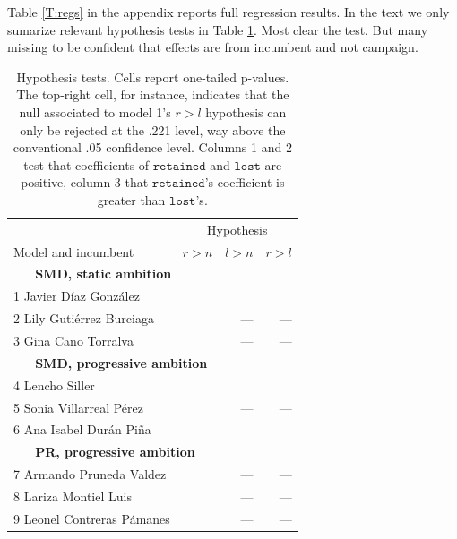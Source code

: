 \documentclass[letter,12pt]{article}
\begin{document}
Table \ref{T:regs} in the appendix reports full regression results. In the text we only sumarize relevant hypothesis tests in Table \ref{T:hyp-tests}. Most clear the test. But many missing to be confident that effects are from incumbent and not campaign.

\begin{table}
\centering
  \begin{tabular}{lrrr}
                          & \multicolumn{3}{c}{Hypothesis} \\
  Model and incumbent     & $r>n$ & $l>n$ & $r>l$ \\ \hline
  \multicolumn{4}{l}{\textbf{~~~SMD, static ambition}} \\
1 Javier Díaz González    & \color{green}{$<.001$} & \color{green}{$.029$} & \color{red}{$.221$} \\
2 Lily Gutiérrez Burciaga & \color{green}{$<.001$} & ---    & --- \\
3 Gina Cano Torralva      & \color{green}{$<.001$} & ---    & --- \\
  \multicolumn{4}{l}{\textbf{~~~SMD, progressive ambition}} \\
4 Lencho Siller           & \color{green}{$<.001$} & \color{green}{$.003$} & \color{green}{$.001$} \\
5 Sonia Villarreal Pérez  & \color{green}{$<.001$} & ---    & --- \\
6 Ana Isabel Durán Piña   & \color{green}{$<.001$} & \color{green}{$.036$} & \color{green}{$<.001$} \\
  \multicolumn{4}{l}{\textbf{~~~PR, progressive ambition}} \\
7 Armando Pruneda Valdez  & \color{green}{$.030$}  & ---    & --- \\
8 Lariza Montiel Luis     & \color{red}{$.385$}    & ---    & --- \\
9 Leonel Contreras Pámanes& \color{green}{$<.001$} & ---    & --- \\ \hline
\end{tabular}
\caption{Hypothesis tests. Cells report one-tailed p-values. The top-right cell, for instance, indicates that the null associated to model 1's $r>l$ hypothesis can only be rejected at the .221 level, way above the conventional .05 confidence level. Columns 1 and 2 test that coefficients of $\texttt{retained}$ and $\texttt{lost}$ are positive, column 3 that $\texttt{retained}$'s coefficient is greater than $\texttt{lost}$'s.}\label{T:hyp-tests}
\end{table}
\end{document}
